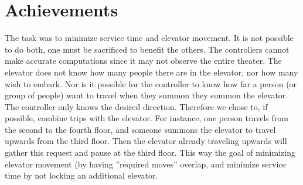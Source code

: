 \section{Achievements}
The task was to minimize service time and elevator movement. It is not possible to do both, one must be sacrificed to benefit the others. The controllers cannot make accurate computations since it may not observe the entire theater. The elevator does not know how many people there are in the elevator, nor how many wish to embark. Nor is it possible for the controller to know how far a person (or group of people) want to travel when they summon they summon the elevator. The controller only knows the desired direction.\newline
Therefore we chose to, if possible, combine trips with the elevator. For instance, one person travels from the second to the fourth floor, and someone summons the elevator to travel upwards from the third floor. Then the elevator already traveling upwards will gather this request and pause at the third floor. This way the goal of minimizing elevator movement (by having ''required moves'' overlap, and minimize service time by not locking an additional elevator. 